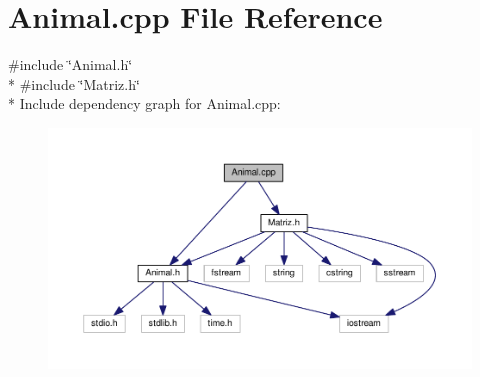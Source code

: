 \section{Animal.\-cpp File Reference}
\label{_animal_8cpp}
{\ttfamily \#include \char`\"{}Animal.\-h\char`\"{}}\\*
{\ttfamily \#include \char`\"{}Matriz.\-h\char`\"{}}\\*
Include dependency graph for Animal.\-cpp\-:
\nopagebreak
\begin{figure}[H]
\begin{center}
\leavevmode
\includegraphics[width=350pt]{_animal_8cpp__incl}
\end{center}
\end{figure}
